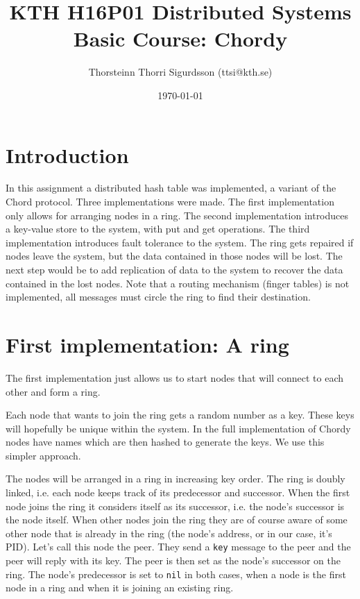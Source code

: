 \documentclass[a4paper, 11pt]{article}
\title{KTH H16P01 Distributed Systems Basic Course: Chordy}
\author{Thorsteinn Thorri Sigurdsson (ttsi@kth.se)}
\date{\today{}}
\begin{document}
\maketitle

\section{Introduction}

In this assignment a distributed hash table was implemented, a variant of the Chord protocol. Three implementations were made. The first implementation only allows for arranging nodes in a ring. The second implementation introduces a key-value store to the system, with put and get operations. The third implementation introduces fault tolerance to the system. The ring gets repaired if nodes leave the system, but the data contained in those nodes will be lost. The next step would be to add replication of data to the system to recover the data contained in the lost nodes. Note that a routing mechanism (finger tables) is not implemented, all messages must circle the ring to find their destination.

\section{First implementation: A ring}

The first implementation just allows us to start nodes that will connect to each other and form a ring.

Each node that wants to join the ring gets a random number as a key. These keys will hopefully be unique within the system. In the full implementation of Chordy nodes have names which are then hashed to generate the keys. We use this simpler approach.

The nodes will be arranged in a ring in increasing key order. The ring is doubly linked, i.e. each node keeps track of its predecessor and successor. When the first node joins the ring it considers itself as its successor, i.e. the node's successor is the node itself. When other nodes join the ring they are of course aware of some other node that is already in the ring (the node's address, or in our case, it's PID). Let's call this node the peer. They send a \texttt{key} message to the peer and the peer will reply with its key. The peer is then set as the node's successor on the ring. The node's predecessor is set to \texttt{nil} in both cases, when a node is the first node in a ring and when it is joining an existing ring.
\end{document}
